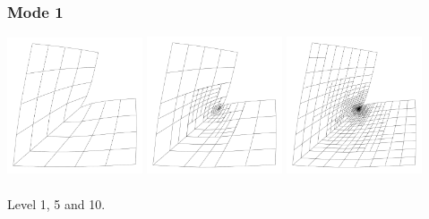 \documentclass{beamer}
\begin{document}
\begin{frame}
  \frametitle{Mode 1}

  \begin{center}
    \includegraphics[width=0.3\textwidth]{lshape/mode-00-00}
    \includegraphics[width=0.3\textwidth]{lshape/mode-04-00}
    \includegraphics[width=0.3\textwidth]{lshape/mode-09-00}
   \\~\\
   Level 1, 5 and 10.
  \end{center}
\end{frame}
\end{document}
